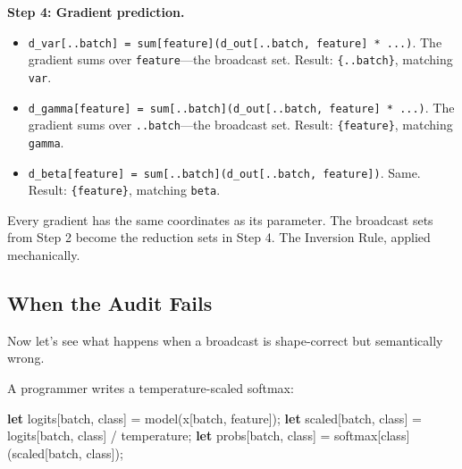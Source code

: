 \documentclass[11pt,titlepage]{article}
\newenvironment{Shaded}{}{}
\newcommand{\KeywordTok}[1]{\textcolor[rgb]{0.00,0.44,0.13}{\textbf{#1}}}
\newcommand{\NormalTok}[1]{#1}
\newcommand{\OperatorTok}[1]{\textcolor[rgb]{0.40,0.40,0.40}{#1}}
\providecommand{\tightlist}{%
  \setlength{\itemsep}{0pt}\setlength{\parskip}{0pt}}
\begin{document}
\textbf{Step 4: Gradient prediction.}

\begin{itemize}
\tightlist
\item
  \texttt{d\_var{[}..batch{]}\ =\ sum{[}feature{]}(d\_out{[}..batch,\ feature{]}\ *\ ...)}.
  The gradient sums over \texttt{feature}---the broadcast set. Result:
  \texttt{\{..batch\}}, matching \texttt{var}.
\item
  \texttt{d\_gamma{[}feature{]}\ =\ sum{[}..batch{]}(d\_out{[}..batch,\ feature{]}\ *\ ...)}.
  The gradient sums over \texttt{..batch}---the broadcast set. Result:
  \texttt{\{feature\}}, matching \texttt{gamma}.
\item
  \texttt{d\_beta{[}feature{]}\ =\ sum{[}..batch{]}(d\_out{[}..batch,\ feature{]})}.
  Same. Result: \texttt{\{feature\}}, matching \texttt{beta}.
\end{itemize}

Every gradient has the same coordinates as its parameter. The broadcast
sets from Step 2 become the reduction sets in Step 4. The Inversion
Rule, applied mechanically.

\vspace{2em}

\hypertarget{when-the-audit-fails}{%
\subsection{When the Audit Fails}\label{when-the-audit-fails}}

Now let's see what happens when a broadcast is shape-correct but
semantically wrong.

A programmer writes a temperature-scaled softmax:

\begin{Shaded}
\begin{Highlighting}[]
\KeywordTok{let}\NormalTok{ logits}\OperatorTok{[}\NormalTok{batch, class}\OperatorTok{]}\NormalTok{ = model(x}\OperatorTok{[}\NormalTok{batch, feature}\OperatorTok{]}\NormalTok{);}
\KeywordTok{let}\NormalTok{ scaled}\OperatorTok{[}\NormalTok{batch, class}\OperatorTok{]}\NormalTok{ = logits}\OperatorTok{[}\NormalTok{batch, class}\OperatorTok{]}\NormalTok{ / temperature;}
\KeywordTok{let}\NormalTok{ probs}\OperatorTok{[}\NormalTok{batch, class}\OperatorTok{]}\NormalTok{ = softmax}\OperatorTok{[}\NormalTok{class}\OperatorTok{]}\NormalTok{(scaled}\OperatorTok{[}\NormalTok{batch, class}\OperatorTok{]}\NormalTok{);}
\end{Highlighting}
\end{Shaded}
\end{document}
